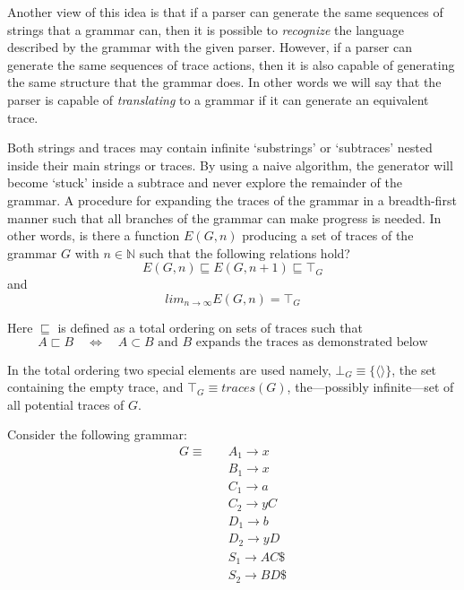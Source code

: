 \documentclass[a4paper,11pt]{article}
\begin{document}
Another view of this idea is that if a parser can generate the same sequences of strings that a grammar can, then it is possible to \emph{recognize} the language described by the grammar with the given parser.
However, if a parser can generate the same sequences of trace actions, then it is also capable of generating the same structure that the grammar does.
In other words we will say that the parser is capable of \emph{translating} to a grammar if it can generate an equivalent trace.

Both strings and traces may contain infinite `substrings' or `subtraces' nested inside their main strings or traces.
By using a naive algorithm, the generator will become `stuck' inside a subtrace and never explore the remainder of the grammar.
A procedure for expanding the traces of the grammar in a breadth-first manner such that all branches of the grammar can make progress is needed.
In other words, is there a function $E(G, n)$ producing a set of traces of the grammar $G$ with $n \in \mathbb{N}$ such that the following relations hold?
\begin{equation} E(G, n) \sqsubseteq E(G, n+1) \sqsubseteq \top_{G} \end{equation}
and 
\begin{equation} lim_{n \to \infty} E(G,n) = \top_{G} \end{equation}

Here $\sqsubseteq$ is defined as a total ordering on sets of traces such that 
\begin{equation} A \sqsubset B \quad \Longleftrightarrow \quad A \subset B \text{ and $B$ expands the traces as demonstrated below} \end{equation}

In the total ordering two special elements are used namely, $\bot_{G} \equiv \{ \langle \rangle \}$, the set containing the empty trace, and $\top_{G} \equiv traces(G)$, the---possibly infinite---set of all potential traces of $G$.

Consider the following grammar:
\begin{align*}
G \equiv \quad & A_1 \rightarrow x\\
               & B_1 \rightarrow x\\
               & C_1 \rightarrow a\\
               & C_2 \rightarrow y C\\
               & D_1 \rightarrow b\\
               & D_2 \rightarrow y D\\
               & S_1 \rightarrow A C \$\\
               & S_2 \rightarrow B D \$
\end{align*}
\end{document}
